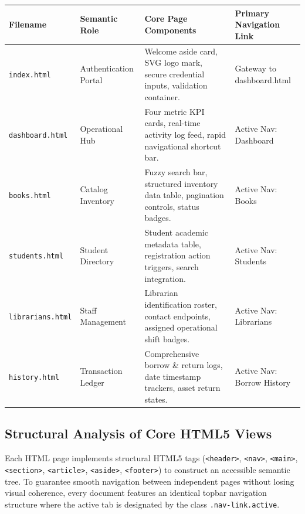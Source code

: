 \documentclass[10pt,journal,compsoc]{IEEEtran}
\begin{document}
\vspace{10pt}
\noindent
\begin{center}
\renewcommand{\arraystretch}{1.3}
\begin{tabular}{|L{2.5cm}|L{3.2cm}|L{6.0cm}|L{3.3cm}|}
\hline
{}
\textbf{\color{white}Filename} & \textbf{\color{white}Semantic Role} & \textbf{\color{white}Core Page Components} & \textbf{\color{white}Primary Navigation Link} \\
\hline
\texttt{index.html} & Authentication Portal & Welcome aside card, SVG logo mark, secure credential inputs, validation container. & Gateway to dashboard.html \\
\hline
{}
\texttt{dashboard.html} & Operational Hub & Four metric KPI cards, real-time activity log feed, rapid navigational shortcut bar. & Active Nav: Dashboard \\
\hline
\texttt{books.html} & Catalog Inventory & Fuzzy search bar, structured inventory data table, pagination controls, status badges. & Active Nav: Books \\
\hline
{}
\texttt{students.html} & Student Directory & Student academic metadata table, registration action triggers, search integration. & Active Nav: Students \\
\hline
\texttt{librarians.html} & Staff Management & Librarian identification roster, contact endpoints, assigned operational shift badges. & Active Nav: Librarians \\
\hline
{}
\texttt{history.html} & Transaction Ledger & Comprehensive borrow \& return logs, date timestamp trackers, asset return states. & Active Nav: Borrow History \\
\hline
\end{tabular}
\end{center}

\subsection{Structural Analysis of Core HTML5 Views}
Each HTML page implements structural HTML5 tags (\texttt{<header>}, \texttt{<nav>}, \texttt{<main>}, \texttt{<section>}, \texttt{<article>}, \texttt{<aside>}, \texttt{<footer>}) to construct an accessible semantic tree. To guarantee smooth navigation between independent pages without losing visual coherence, every document features an identical topbar navigation structure where the active tab is designated by the class \texttt{.nav-link.active}.
\end{document}
